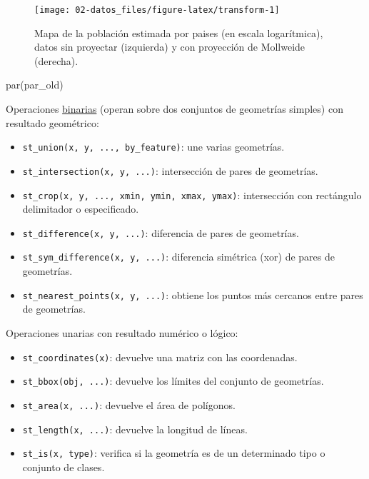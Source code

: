\documentclass[
  spanish,
]{book}
\newenvironment{Shaded}{\begin{snugshade}}{\end{snugshade}}
\newcommand{\FunctionTok}[1]{\textcolor[rgb]{0.00,0.00,0.00}{#1}}
\newcommand{\NormalTok}[1]{#1}
\providecommand{\tightlist}{%
  \setlength{\itemsep}{0pt}\setlength{\parskip}{0pt}}
\theoremstyle{break}
\theoremstyle{definition}
\theoremstyle{definition}
\theoremstyle{definition}
\theoremstyle{definition}
\theoremstyle{remark}
\begin{document}
\begin{figure}[!htb]

{\centering \texttt{[image: 02-datos\_files/figure-latex/transform-1]} 

}

\caption{Mapa de la población estimada por paises (en escala logarítmica), datos sin proyectar (izquierda) y con proyección de Mollweide (derecha).}\label{fig:transform}
\end{figure}

\begin{Shaded}
\begin{Highlighting}[]
\FunctionTok{par}\NormalTok{(par\_old)}
\end{Highlighting}
\end{Shaded}

Operaciones \href{https://r-spatial.github.io/sf/reference/geos_binary_ops.html}{binarias} (operan sobre dos conjuntos de geometrías simples) con resultado geométrico:

\begin{itemize}
\tightlist
\item
  \texttt{st\_union(x,\ y,\ ...,\ by\_feature)}: une varias geometrías.
\item
  \texttt{st\_intersection(x,\ y,\ ...)}: intersección de pares de geometrías.
\item
  \texttt{st\_crop(x,\ y,\ ...,\ xmin,\ ymin,\ xmax,\ ymax)}: intersección con rectángulo delimitador o especificado.
\item
  \texttt{st\_difference(x,\ y,\ ...)}: diferencia de pares de geometrías.
\item
  \texttt{st\_sym\_difference(x,\ y,\ ...)}: diferencia simétrica (xor) de pares de geometrías.
\item
  \texttt{st\_nearest\_points(x,\ y,\ ...)}: obtiene los puntos más cercanos entre pares de geometrías.
\end{itemize}

Operaciones unarias con resultado numérico o lógico:

\begin{itemize}
\tightlist
\item
  \texttt{st\_coordinates(x)}: devuelve una matriz con las coordenadas.
\item
  \texttt{st\_bbox(obj,\ ...)}: devuelve los límites del conjunto de geometrías.
\item
  \texttt{st\_area(x,\ ...)}: devuelve el área de polígonos.
\item
  \texttt{st\_length(x,\ ...)}: devuelve la longitud de líneas.
\item
  \texttt{st\_is(x,\ type)}: verifica si la geometría es de un determinado tipo o conjunto de clases.
\end{itemize}
\end{document}
